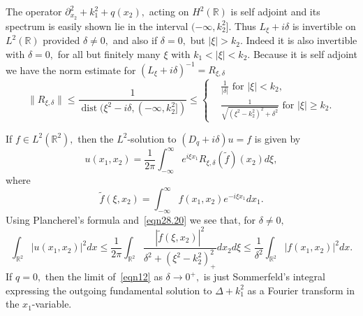 \documentclass[11pt]{article}
\newcommand\dist{\operatorname{dist}}
\newcommand\tf{\tilde{f}}
\newcommand\bbR{\mathbb R}
\newcommand\pa{\partial}
\theoremstyle{definition}
\theoremstyle{remark}
\begin{document}
The operator $\pa_{x_2}^2+k_1^2+q(x_2),$ acting on
$H^2(\bbR)$ is self adjoint and its spectrum is
easily shown lie in the interval $(-\infty,k_2^2].$ Thus
  $L_{\xi}+i\delta$ is invertible on
$L^2(\bbR)$ provided $\delta\neq 0,$ and also if $\delta=0,$ but
$|\xi|>k_2.$ Indeed it is also invertible with $\delta =0,$ for all
but finitely many $\xi$ with $k_1<|\xi|<k_2.$ Because it is self adjoint we
have the norm estimate for
$(L_{\xi}+i\delta)^{-1}=R_{\xi,\delta}$
\begin{equation}\label{eqn28.20}
  \|R_{\xi,\delta}\|\leq
  \frac{1}{\dist(\xi^2-i\delta,(-\infty,k_2^2])}\leq
    \begin{cases}&\frac{1}{|\delta|}\text{ for }|\xi|<k_2,\\
      &\frac{1}{\sqrt{(\xi^2-k_2^2)^2+\delta^2}}\text{ for }|\xi|\geq
      k_2.
      \end{cases}
\end{equation}

If $f\in L^2(\bbR^2),$ then
the $L^2$-solution to $(D_{q}+i\delta)u=f$ is given by
\begin{equation}\label{eqn12}
  u(x_1,x_2)=\frac{1}{2\pi}\int_{-\infty}^{\infty}e^{i\xi x_1}R_{\xi,\delta}(\tf)(x_2)d\xi,
\end{equation}
where
\begin{equation}
  \tf(\xi,x_2)=\int_{-\infty}^{\infty}f(x_1,x_2)e^{-i\xi x_1}dx_1.
\end{equation}
Using Plancherel's formula and~\eqref{eqn28.20} we see that, for $\delta\neq 0,$
  \begin{equation}
    \int_{\bbR^2}|u(x_1,x_2)|^2dx\leq
    \frac{1}{2\pi}\int_{\bbR^2}\frac{|\tf(\xi,x_2)|^2}{\delta^2+(\xi^2-k_2^2)_+^2}dx_2d\xi
    \leq \frac{1}{\delta^2}\int_{\bbR^2}|f(x_1,x_2)|^2dx.
  \end{equation}
 If $q=0,$ then the limit of~\eqref{eqn12} as $\delta\to 0^+,$ is just
 Sommerfeld's integral expressing the outgoing fundamental solution to
 $\Delta+k_1^2$ as a Fourier transform in the $x_1$-variable.


 
\end{document}
